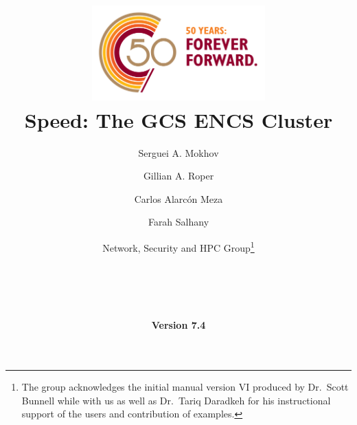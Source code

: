 \documentclass{easychair}
\begin{document}
%
\title{
    \includegraphics[width=0.5\textwidth]{images/concordia-logo-50th-tagline.png}
    \\[1.5em]
    Speed: The GCS ENCS Cluster}



\date{\textbf{Version 7.4}}

\author{
    Serguei A. Mokhov
\and
    Gillian A. Roper
\and
    Carlos Alarcón Meza
\and
    Farah Salhany
\and
    Network, Security and HPC Group\footnote{The group acknowledges the initial manual version VI produced by Dr.~Scott Bunnell while with us
		as well as Dr.~Tariq Daradkeh for his instructional support of the users and contribution of examples.}\\
    \\
    \\
    \\
    \\
}

%
\end{document}
